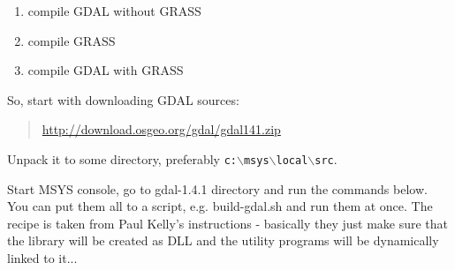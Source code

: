 \begin{enumerate}
\item compile GDAL without GRASS
\item compile GRASS
\item compile GDAL with GRASS
\end{enumerate}

So, start with downloading GDAL sources:

	\begin{quotation}
\url{http://download.osgeo.org/gdal/gdal141.zip}
	\end{quotation}

Unpack it to some directory, preferably \texttt{c:$\backslash$msys$\backslash$local$\backslash$src}.

Start MSYS console, go to gdal-1.4.1 directory and run the commands below.
You can put them all to a script, e.g. build-gdal.sh and run them at once.
The recipe is taken from Paul Kelly's instructions - basically they
just make sure that the library will be created as DLL and the utility
programs will be dynamically linked to it...

